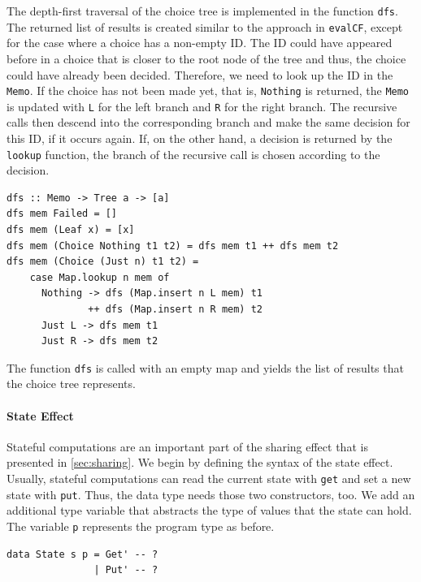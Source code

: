 \documentclass[a4paper, 11pt, fleqn, twoside]{scrreprt}
\newcommand{\todo}[1]{\marginpar{\textbf{TODO:} #1}}
\newcommand{\hinl}[1]{\texttt{#1}}
\begin{document}
The depth-first traversal of the choice tree is implemented in the function \hinl{dfs}.
The returned list of results is created similar to the approach in \hinl{evalCF}, except for the case where a choice has a non-empty ID.
The ID could have appeared before in a choice that is closer to the root node of the tree and thus, the choice could have already been decided.
Therefore, we need to look up the ID in the \hinl{Memo}.
If the choice has not been made yet, that is, \hinl{Nothing} is returned, the \hinl{Memo} is updated with \hinl{L} for the left branch and \hinl{R} for the right branch.
The recursive calls then descend into the corresponding branch and make the same decision for this ID, if it occurs again.
If, on the other hand, a decision is returned by the \hinl{lookup} function, the branch of the recursive call is chosen according to the decision.

\begin{verbatim}
dfs :: Memo -> Tree a -> [a]
dfs mem Failed = []
dfs mem (Leaf x) = [x]
dfs mem (Choice Nothing t1 t2) = dfs mem t1 ++ dfs mem t2
dfs mem (Choice (Just n) t1 t2) =
    case Map.lookup n mem of
      Nothing -> dfs (Map.insert n L mem) t1 
              ++ dfs (Map.insert n R mem) t2
      Just L -> dfs mem t1
      Just R -> dfs mem t2
\end{verbatim}

The function \hinl{dfs} is called with an empty map and yields the list of results that the choice tree represents.
\todo{Examples}

\paragraph{State Effect}
Stateful computations are an important part of the sharing effect that is presented in \autoref{sec:sharing}.
We begin by defining the syntax of the state effect.
Usually, stateful computations can read the current state with \hinl{get} and set a new state with \hinl{put}.
Thus, the data type needs those two constructors, too.
We add an additional type variable that abstracts the type of values that the state can hold.
The variable \hinl{p} represents the program type as before.

\begin{verbatim}
data State s p = Get' -- ?
               | Put' -- ?
\end{verbatim}
\end{document}
